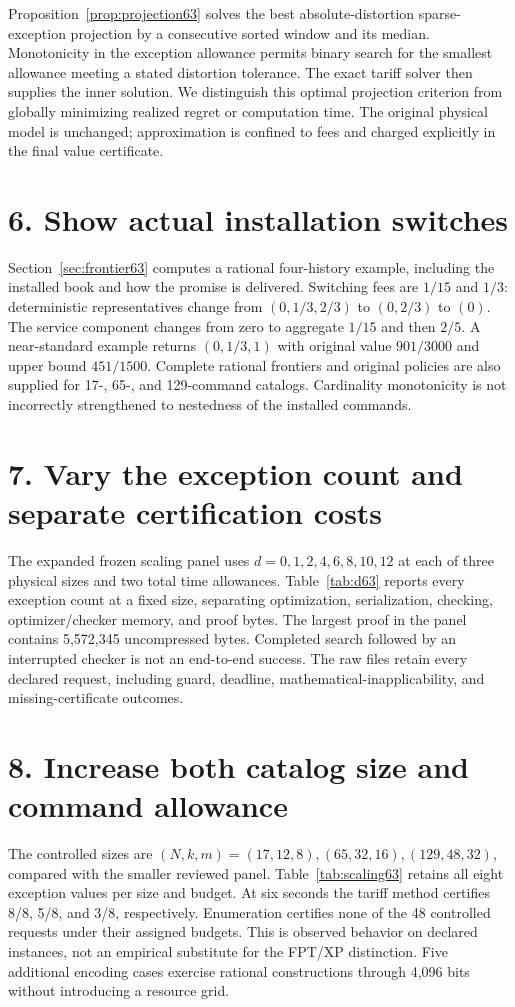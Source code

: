 \documentclass[11pt,letterpaper]{article}
\theoremstyle{definition}\newtheorem{remark}[theorem]{Remark}
\begin{document}
Proposition~\ref{prop:projection63} solves the best absolute-distortion sparse-exception projection by a consecutive sorted window and its median. Monotonicity in the exception allowance permits binary search for the smallest allowance meeting a stated distortion tolerance. The exact tariff solver then supplies the inner solution. We distinguish this optimal projection criterion from globally minimizing realized regret or computation time. The original physical model is unchanged; approximation is confined to fees and charged explicitly in the final value certificate.

\section*{6. Show actual installation switches}
Section~\ref{sec:frontier63} computes a rational four-history example, including the installed book and how the promise is delivered. Switching fees are $1/15$ and $1/3$: deterministic representatives change from $(0,1/3,2/3)$ to $(0,2/3)$ to $(0)$. The service component changes from zero to aggregate $1/15$ and then $2/5$. A near-standard example returns $(0,1/3,1)$ with original value $901/3000$ and upper bound $451/1500$. Complete rational frontiers and original policies are also supplied for 17-, 65-, and 129-command catalogs. Cardinality monotonicity is not incorrectly strengthened to nestedness of the installed commands.

\section*{7. Vary the exception count and separate certification costs}
The expanded frozen scaling panel uses $d=0,1,2,4,6,8,10,12$ at each of three physical sizes and two total time allowances. Table~\ref{tab:d63} reports every exception count at a fixed size, separating optimization, serialization, checking, optimizer/checker memory, and proof bytes. The largest proof in the panel contains 5,572,345 uncompressed bytes. Completed search followed by an interrupted checker is not an end-to-end success. The raw files retain every declared request, including guard, deadline, mathematical-inapplicability, and missing-certificate outcomes.

\section*{8. Increase both catalog size and command allowance}
The controlled sizes are $(N,k,m)=(17,12,8),(65,32,16),(129,48,32)$, compared with the smaller reviewed panel. Table~\ref{tab:scaling63} retains all eight exception values per size and budget. At six seconds the tariff method certifies 8/8, 5/8, and 3/8, respectively. Enumeration certifies none of the 48 controlled requests under their assigned budgets. This is observed behavior on declared instances, not an empirical substitute for the FPT/XP distinction. Five additional encoding cases exercise rational constructions through 4,096 bits without introducing a resource grid.
\end{document}
